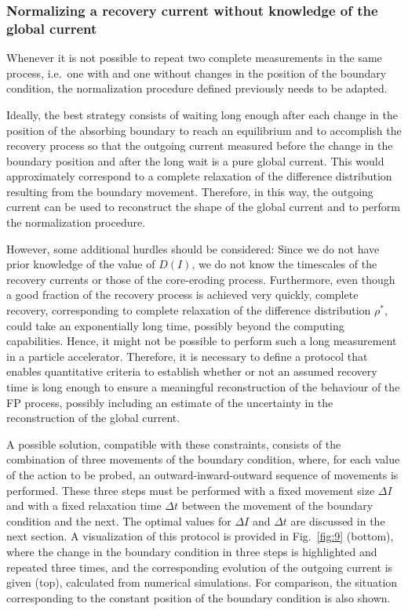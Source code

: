 {%

\subsubsection{Normalizing a recovery current without knowledge of the global current}


Whenever it is not possible to repeat two complete measurements in the same process, i.e.\ one with and one without changes in the position of the boundary condition, the normalization procedure defined previously needs to be adapted.

Ideally, the best strategy consists of waiting long enough after each change in the position of the absorbing boundary to reach an equilibrium and to accomplish the recovery process so that the outgoing current measured before the change in the boundary position and after the long wait is a pure global current. This would approximately correspond to a complete relaxation of the difference distribution resulting from the boundary movement. Therefore, in this way, the outgoing current can be used to reconstruct the shape of the global current and to perform the normalization procedure.

However, some additional hurdles should be considered: Since we do not have prior knowledge of the value of $D(I)$, we do not know the timescales of the recovery currents or those of the core-eroding process. Furthermore, even though a good fraction of the recovery process is achieved very quickly, complete recovery, corresponding to complete relaxation of the difference distribution $\rho^\ast$, could take an exponentially long time, possibly beyond the computing capabilities. Hence, it might not be possible to perform such a long measurement in a particle accelerator. Therefore, it is necessary to define a protocol that enables quantitative criteria to establish whether or not an assumed recovery time is long enough to ensure a meaningful reconstruction of the behaviour of the FP process, possibly including an estimate of the uncertainty in the reconstruction of the global current.

A possible solution, compatible with these constraints, consists of the combination of three movements of the boundary condition, where, for each value of the action to be probed, an outward-inward-outward sequence of movements is performed. These three steps must be performed with a fixed movement size $\Delta I$ and with a fixed relaxation time $\Delta t$ between the movement of the boundary condition and the next. The optimal values for $\Delta I$ and $\Delta t$ are discussed in the next section. A visualization of this protocol is provided in Fig.~\ref{fig:9} (bottom), where the change in the boundary condition in three steps is highlighted and repeated three times, and the corresponding evolution of the outgoing current is given (top), calculated from numerical simulations. For comparison, the situation corresponding to the constant position of the boundary condition is also shown.

}
